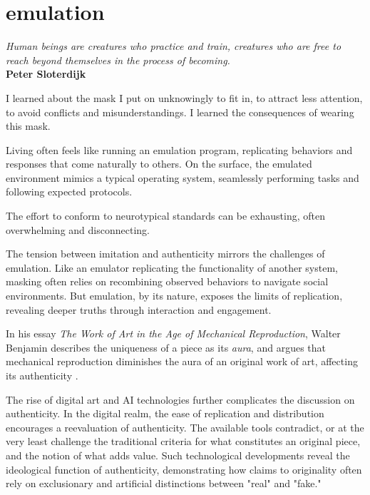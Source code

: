\chapter*{emulation}
\begin{center}
\vspace{2cm}
\begin{flushright}
\large
\textit{Human beings are creatures who practice and train, creatures who are free to reach beyond themselves in the process of becoming.}\\
\textbf{Peter Sloterdijk} \citep{sloterdijk2014}
\end{flushright}
\vspace{2cm}
\end{center}
\normalsize

\newpage  %
I learned about the mask I put on unknowingly to fit in, to attract less attention, to avoid conflicts and misunderstandings. I learned the consequences of wearing this mask.

Living often feels like running an emulation program, replicating behaviors and responses that come naturally to others. On the surface, the emulated environment mimics a typical operating system, seamlessly performing tasks and following expected protocols. 

The effort to conform to neurotypical standards can be exhausting, often overwhelming and disconnecting.

The tension between imitation and authenticity mirrors the challenges of emulation. Like an emulator replicating the functionality of another system, masking often relies on recombining observed behaviors to navigate social environments. But emulation, by its nature, exposes the limits of replication, revealing deeper truths through interaction and engagement.

In his essay \textit{The Work of Art in the Age of Mechanical Reproduction}, Walter Benjamin describes the uniqueness of a piece as its \textit{aura}, and argues that mechanical reproduction diminishes the aura of an original work of art, affecting its authenticity \citep{benjamin1935}. 

The rise of digital art and AI technologies further complicates the discussion on authenticity. In the digital realm, the ease of replication and distribution encourages a reevaluation of authenticity. The available tools contradict, or at the very least challenge the traditional criteria for what constitutes an original piece, and the notion of what adds value. Such technological developments reveal the ideological function of authenticity, demonstrating how claims to originality often rely on exclusionary and artificial distinctions between "real" and "fake."

